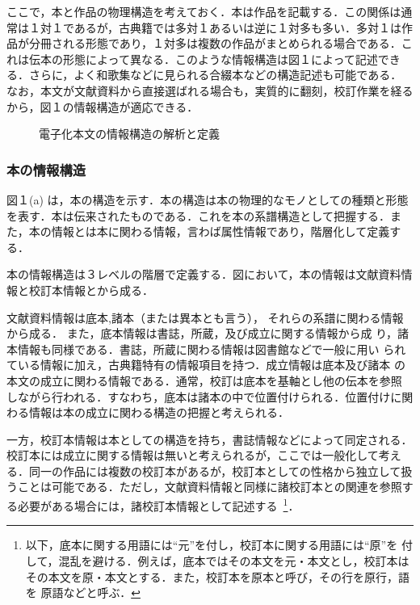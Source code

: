 ここで，本と作品の物理構造を考えておく．本は作品を記載する．この関係は通
常は１対１であるが，古典籍では多対１あるいは逆に１対多も多い．多対１は作
品が分冊される形態であり，１対多は複数の作品がまとめられる場合である．こ
れは伝本の形態によって異なる．このような情報構造は図１によって記述でき
る．さらに，よく和歌集などに見られる合綴本などの構造記述も可能である．
なお，本文が文献資料から直接選ばれる場合も，実質的に翻刻，校訂作業を経る
から，図１の情報構造が適応できる．

\begin{figure}[htbp]
  \begin{center}
    \leavevmode
    \vspace*{-2mm}
\vspace*{5mm}
    \caption{電子化本文の情報構造の解析と定義}
    \label{fig:1}
  \end{center}
\end{figure}

\subsubsection{本の情報構造}
\label{sec:2.2.2setu}


図１(a) は，本の構造を示す．本の構造は本の物理的なモノとしての種類と形態
を表す．本は伝来されたものである．これを本の系譜構造として把握する．ま
た，本の情報とは本に関わる情報，言わば属性情報であり，階層化して定義す
る．

本の情報構造は３レベルの階層で定義する．図において，本の情報は文献資料情
報と校訂本情報とから成る．

文献資料情報は底本\yougo ,諸本（または異本\yougo とも言う），
それらの系譜に関わる情報から成る．
また，底本情報は書誌，所蔵，及び成立に関する情報から成
り，諸本情報も同様である．書誌，所蔵に関わる情報は図書館などで一般に用い
られている情報に加え，古典籍特有の情報項目を持つ．成立情報は底本及び諸本
の本文の成立に関わる情報である．通常，校訂は底本を基軸とし他の伝本を参照
しながら行われる．すなわち，底本は諸本の中で位置付けられる．位置付けに関
わる情報は本の成立に関わる構造の把握と考えられる．

一方，校訂本情報は本としての構造を持ち，書誌情報などによって同定される．
校訂本には成立に関する情報は無いと考えられるが，ここでは一般化して考え
る．同一の作品には複数の校訂本があるが，校訂本としての性格から独立して扱
うことは可能である．ただし，文献資料情報と同様に諸校訂本との関連を参照す
る必要がある場合には，諸校訂本情報として記述する~\footnote{
  以下，底本に関する用語には“元”を付し，校訂本に関する用語には“原”を
  付して，混乱を避ける．例えば，底本ではその本文を元・本文とし，校訂本は
  その本文を原・本文とする．また，校訂本を原本と呼び，その行を原行，語を
  原語などと呼ぶ．}．


